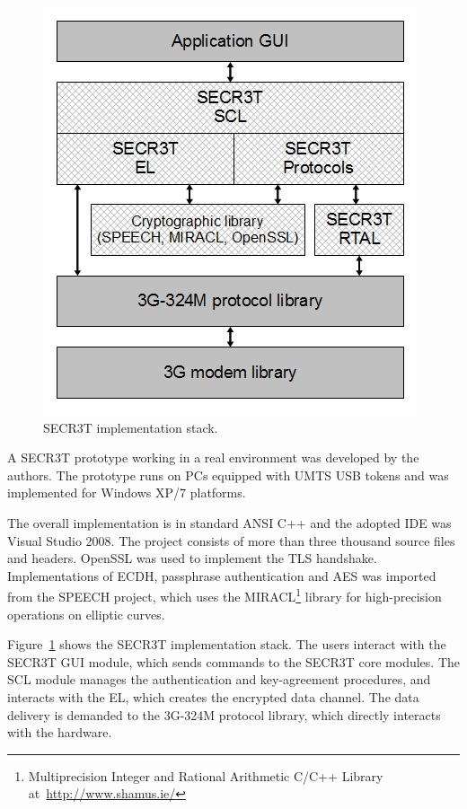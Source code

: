 \documentclass[10pt, conference, compsocconf]{IEEEtran}
\begin{document}
\begin{figure}[!htbp]
\centering
\includegraphics[scale=0.43]{pics/implementation_stack.jpg}
\caption{SECR3T implementation stack.}
\label{fig:implstack}
\end{figure}

A SECR3T prototype working in a real environment was developed by the authors.
The prototype runs on PCs equipped with UMTS USB tokens and was implemented for Windows XP/7 platforms.

The overall implementation is in standard ANSI C++ and the adopted IDE was Visual Studio 2008. The project consists of more than three thousand source files and headers. OpenSSL was used to implement the TLS handshake. Implementations of ECDH, passphrase authentication and AES was imported from the SPEECH project, which uses the MIRACL\footnote{Multiprecision Integer and Rational Arithmetic C/C++ Library at~\url{http://www.shamus.ie/}} library for high-precision operations on elliptic curves.

Figure~\ref{fig:implstack} shows the SECR3T implementation stack. The users interact with the SECR3T GUI module, which sends commands to the SECR3T core modules. The SCL module manages the authentication and key-agreement procedures, and interacts with the EL, which creates the encrypted data channel. The data delivery is demanded to the 3G-324M protocol library, which directly interacts with the hardware.
\end{document}

